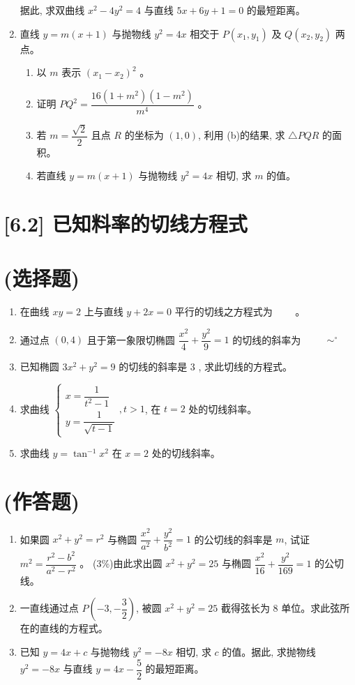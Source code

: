 \documentclass[10pt]{article}
\begin{document}
\begin{enumerate}
  据此, 求双曲线 $x^{2}-4 y^{2}=4$ 与直线 $5 x+6 y+1=0$ 的最短距离。
  \item 直线 $y=m(x+1)$ 与抛物线 $y^{2}=4 x$ 相交于 $P\left(x_{1}, y_{1}\right)$ 及 $Q\left(x_{2}, y_{2}\right)$ 两点。
  \begin{enumerate}
    \item 以 $m$ 表示 $\left(x_{1}-x_{2}\right)^{2}$ 。
    \item 证明 $PQ^{2}=\dfrac{16\left(1+m^{2}\right)\left(1-m^{2}\right)}{m^{4}}$ 。
    \item 若 $m=\dfrac{\sqrt{2}}{2}$ 且点 $R$ 的坐标为 $(1,0)$, 利用 (b)的结果, 求 $\triangle PQR$ 的面积。
    \item 若直线 $y=m(x+1)$ 与抛物线 $y^{2}=4 x$ 相切, 求 $m$ 的值。
  \end{enumerate}
\end{enumerate}

\section*{[6.2] 已知料率的切线方程式}
\section*{(选择题)}
\begin{enumerate}
  \item 在曲线 $x y=2$ 上与直线 $y+2 x=0$ 平行的切线之方程式为 $\qquad$。
  \item 通过点 $(0,4)$ 且于第一象限切椭圆 $\dfrac{x^{2}}{4}+\dfrac{y^{2}}{9}=1$ 的切线的斜率为 $\qquad$ $\sim^{\circ}$
  \item 已知椭圆 $3 x^{2}+y^{2}=9$ 的切线的斜率是 3 , 求此切线的方程式。
  \item 求曲线 $\left\{\begin{array}{l}x=\dfrac{1}{t^{2}-1} \\ y=\dfrac{1}{\sqrt{t-1}}\end{array}, t>1\right.$, 在 $t=2$ 处的切线斜率。
  \item 求曲线 $y=\tan ^{-1} x^{2}$ 在 $x=2$ 处的切线斜率。
\end{enumerate}

\section*{(作答题)}
\begin{enumerate}
  \item 如果圆 $x^{2}+y^{2}=r^{2}$ 与椭圆 $\dfrac{x^{2}}{a^{2}}+\dfrac{y^{2}}{b^{2}}=1$ 的公切线的斜率是 $m$, 试证 $m^{2}=\dfrac{r^{2}-b^{2}}{a^{2}-r^{2}}$ 。 (3\%)由此求出圆 $x^{2}+y^{2}=25$ 与椭圆 $\dfrac{x^{2}}{16}+\dfrac{y^{2}}{169}=1$ 的公切线。
  \item 一直线通过点 $P\left(-3,-\dfrac{3}{2}\right)$, 被圆 $x^{2}+y^{2}=25$ 截得弦长为 8 单位。求此弦所在的直线的方程式。
  \item 已知 $y=4 x+c$ 与抛物线 $y^{2}=-8 x$ 相切, 求 $c$ 的值。据此, 求抛物线 $y^{2}=-8 x$ 与直线 $y=4 x-\dfrac{5}{2}$ 的最短距离。
\end{enumerate}
\end{document}
